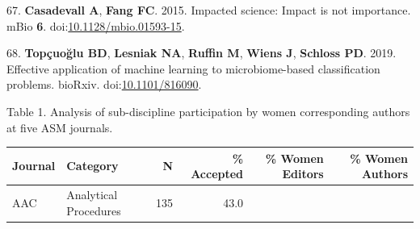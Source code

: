 \documentclass[11pt,]{article}
\begin{document}
\hypertarget{ref-Casadevall2015}{}
67. \textbf{Casadevall A}, \textbf{Fang FC}. 2015. Impacted science:
Impact is not importance. mBio \textbf{6}.
doi:\href{https://doi.org/10.1128/mbio.01593-15}{10.1128/mbio.01593-15}.

\hypertarget{ref-Topcuoglu2019}{}
68. \textbf{Topçuoğlu BD}, \textbf{Lesniak NA}, \textbf{Ruffin M},
\textbf{Wiens J}, \textbf{Schloss PD}. 2019. Effective application of
machine learning to microbiome-based classification problems. bioRxiv.
doi:\href{https://doi.org/10.1101/816090}{10.1101/816090}.

\newpage

Table 1. Analysis of sub-discipline participation by women corresponding
authors at five ASM journals.

\begin{longtable}[]{@{}llrrrr@{}}
\toprule
\begin{minipage}[b]{0.06\columnwidth}\raggedright\strut
Journal\strut
\end{minipage} & \begin{minipage}[b]{0.43\columnwidth}\raggedright\strut
Category\strut
\end{minipage} & \begin{minipage}[b]{0.04\columnwidth}\raggedleft\strut
N\strut
\end{minipage} & \begin{minipage}[b]{0.08\columnwidth}\raggedleft\strut
\% Accepted\strut
\end{minipage} & \begin{minipage}[b]{0.11\columnwidth}\raggedleft\strut
\% Women Editors\strut
\end{minipage} & \begin{minipage}[b]{0.11\columnwidth}\raggedleft\strut
\% Women Authors\strut
\end{minipage}\tabularnewline
\midrule
\endhead
\begin{minipage}[t]{0.06\columnwidth}\raggedright\strut
AAC\strut
\end{minipage} & \begin{minipage}[t]{0.43\columnwidth}\raggedright\strut
Analytical Procedures\strut
\end{minipage} & \begin{minipage}[t]{0.04\columnwidth}\raggedleft\strut
135\strut
\end{minipage} & \begin{minipage}[t]{0.08\columnwidth}\raggedleft\strut
43.0\strut
\end{minipage} & \begin{minipage}[t]{0.11\columnwidth}\raggedleft\strut

\end{minipage}
\end{longtable}
\end{document}
